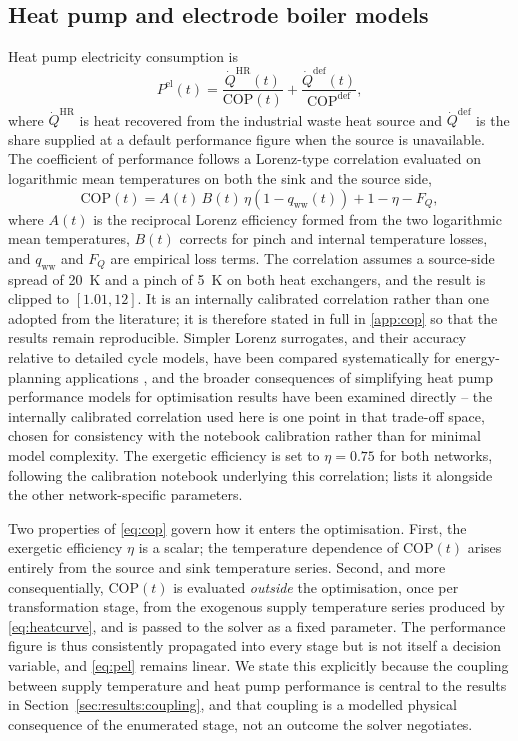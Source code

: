 \documentclass[review,3p]{elsarticle}
\newcommand{\COP}{\mathrm{COP}}
\begin{document}
\subsection{Heat pump and electrode boiler models}
\label{sec:model:hp}

Heat pump electricity consumption is
\begin{equation}
\label{eq:pel}
P^{\mathrm{el}}(t) = \frac{\dot{Q}^{\mathrm{HR}}(t)}{\COP(t)}
 + \frac{\dot{Q}^{\mathrm{def}}(t)}{\COP^{\mathrm{def}}},
\end{equation}
where $\dot{Q}^{\mathrm{HR}}$ is heat recovered from the industrial
waste heat source and $\dot{Q}^{\mathrm{def}}$ is the share supplied at
a default performance figure when the source is unavailable. The
coefficient of performance follows a Lorenz-type correlation evaluated
on logarithmic mean temperatures on both the sink and the source side,
\begin{equation}
\label{eq:cop}
\COP(t) = A(t)\, B(t)\, \eta \left(1 - q_{\mathrm{ww}}(t)\right)
+ 1 - \eta - F_Q ,
\end{equation}
where $A(t)$ is the reciprocal Lorenz efficiency formed from the two
logarithmic mean temperatures, $B(t)$ corrects for pinch and internal
temperature losses, and $q_{\mathrm{ww}}$ and $F_Q$ are empirical loss
terms. The correlation assumes a source-side spread of \SI{20}{\kelvin}
and a pinch of \SI{5}{\kelvin} on both heat exchangers, and the result is
clipped to $[1.01, 12]$. It is an internally calibrated correlation
rather than one adopted from the literature; it is therefore stated in
full in \ref{app:cop} so that the results remain reproducible. Simpler
Lorenz surrogates, and their accuracy relative to detailed cycle models,
have been compared systematically for energy-planning applications
\cite{Pieper.2020}, and the broader consequences of simplifying heat
pump performance models for optimisation results have been examined
directly \cite{Zaubitzer.2026,Kuosa.2024} -- the internally calibrated
correlation used here is one point in that trade-off space, chosen for
consistency with the notebook calibration rather than for minimal model
complexity. The exergetic efficiency is set to $\eta=0.75$ for
both networks, following the calibration notebook underlying this
correlation;  lists it alongside the other network-specific
parameters.

Two properties of \cref{eq:cop} govern how it enters the optimisation.
First, the exergetic efficiency $\eta$ is a scalar; the temperature
dependence of $\COP(t)$ arises entirely from the source and sink
temperature series. Second, and more consequentially, $\COP(t)$ is
evaluated \emph{outside} the optimisation, once per transformation
stage, from the exogenous supply temperature series produced by
\cref{eq:heatcurve}, and is passed to the solver as a fixed parameter.
The performance figure is thus consistently propagated into every stage
but is not itself a decision variable, and \cref{eq:pel} remains linear.
We state this explicitly because the coupling between supply
temperature and heat pump performance is central to the results in
Section~\ref{sec:results:coupling}, and that coupling is a modelled
physical consequence of the enumerated stage, not an outcome the solver
negotiates.
\end{document}
